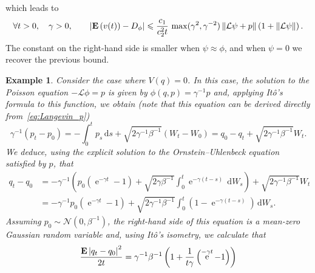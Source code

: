 \documentclass[11pt,a4paper]{article}
\DeclareMathOperator{\e}{e}
\newcommand{\expect}[0]{\mathbf{E}}
\renewcommand{\d}{\mathrm d}
\theoremstyle{plain}
\newtheorem{example}{Example}[section]
\numberwithin{equation}{section}
\renewcommand{\leq}{\leqslant}
\begin{document}
which leads to
\begin{align*}
    \forall t > 0, \quad \gamma > 0, \qquad
    \abs{\expect \left( v(t) \right) - D_{\phi}}
    \leq \frac{c_1}{c_2^2 t} \, \max(\gamma^2, \gamma^{-2}) \norm{\mathcal L\psi + p}  \left(1 + \norm{\mathcal L \psi} \right).
\end{align*}
The constant on the right-hand side is smaller when $\psi \approx \phi$,
and when $\psi = 0$ we recover the previous bound.

\begin{example}
    Consider the case where $V(q) = 0$.
    In this case, the solution to the Poisson equation $- \mathcal L \phi = p$ is given by $\phi(q, p) = \gamma^{-1} p$ and,
    applying Itô's formula to this function, we obtain
    (note that this equation can be derived directly from~\eqref{eq:Langevin_p})
    \[
        \gamma^{-1}(p_t - p_0) = - \int_{0}^{t} p_s \, \d s + \sqrt{2 \gamma^{-1} \beta^{-1}} (W_t - W_0)
        = q_0 - q_t + \sqrt{2 \gamma^{-1} \beta^{-1}} W_t.
    \]
    We deduce, using the explicit solution to the Ornstein--Uhlenbeck equation satisfied by $p$, that
    \begin{align*}
        q_t - q_0
        &= - \gamma^{-1} \left( p_0 \left(\e^{-\gamma t} - 1\right) + \sqrt{2 \gamma \beta^{-1}}\int_{0}^{t} \e^{-\gamma (t - s)} \, \d W_s \right)
        + \sqrt{2 \gamma^{-1} \beta^{-1}} W_t \\
        &=  - \gamma^{-1} p_0 \left(\e^{-\gamma t} - 1\right) + \sqrt{2 \gamma^{-1} \beta^{-1}}\int_{0}^{t} \left(1 - \e^{-\gamma (t - s)}\right) \, \d W_s.
    \end{align*}
    Assuming $p_0 \sim \mathcal N(0, \beta^{-1})$,
    the right-hand side of this equation is a mean-zero Gaussian random variable and,
    using It\^o's isometry, we calculate that
    \[
        \frac{\expect \abs{q_t - q_0}^2}{2t} = \gamma^{-1} \beta^{-1} \left( 1 + \frac{1}{t \gamma} \left(\e^{-\gamma t} - 1\right) \right)
    \]
\end{example}
\end{document}
